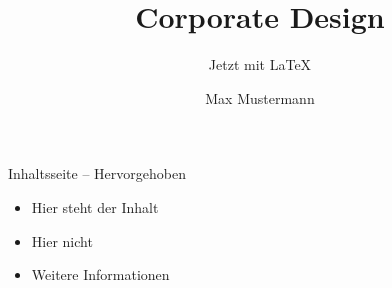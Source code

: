 \documentclass{beamer}
\begin{document}
\title{Corporate Design}
\subtitle{Jetzt mit \LaTeX}
\author{Max Mustermann}

\begin{highlightframe}{Inhaltsseite -- Hervorgehoben}
  \begin{itemize}
    \item Hier steht der Inhalt
    \item Hier nicht
    \item Weitere Informationen
  \end{itemize}
\end{highlightframe}
\end{document}
